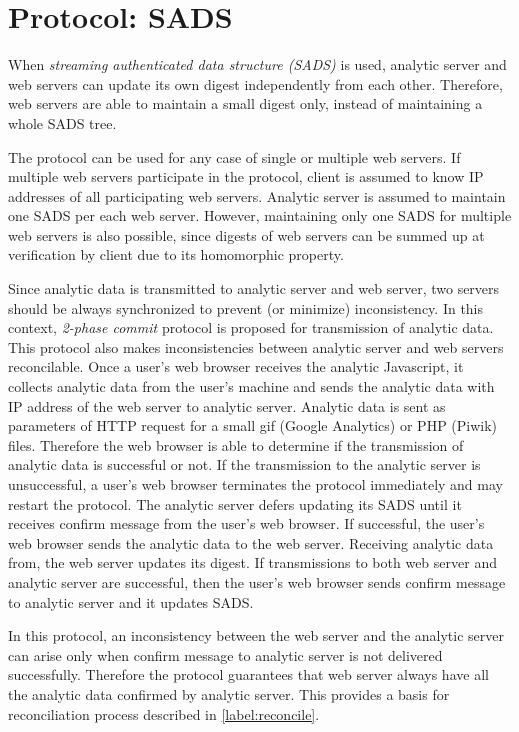\section{Protocol: SADS}

When \emph{streaming authenticated data structure (SADS)} is used, analytic server and web servers can update its own digest independently from each other.  
Therefore, web servers are able to maintain a small digest only, instead of maintaining a whole SADS tree.

The protocol can be used for any case of single or multiple web servers.
If multiple web servers participate in the protocol, client is assumed to know IP addresses of all participating web servers. 
Analytic server is assumed to maintain one SADS per each web server. 
However, maintaining only one SADS for multiple web servers is also possible, since digests of web servers can be summed up at verification by client due to its homomorphic property.

Since analytic data is transmitted to analytic server and web server, two servers should be always synchronized to prevent (or minimize) inconsistency. 
In this context, \emph{2-phase commit} protocol is proposed for transmission of analytic data. 
This protocol also makes inconsistencies between analytic server and web servers reconcilable. 
Once a user's web browser receives the analytic Javascript, it collects analytic data from the user's machine and sends the analytic data with IP address of the web server to analytic server. 
Analytic data is sent as parameters of HTTP request for a small gif (Google Analytics) or PHP (Piwik) files. 
Therefore the web browser is able to determine if the transmission of analytic data is successful or not. 
If the transmission to the analytic server is unsuccessful, a user's web browser terminates the protocol immediately and may restart the protocol. 
The analytic server defers updating its SADS until it receives confirm message from the user's web browser. 
If successful, the user's web browser sends the analytic data to the web server. 
Receiving analytic data from, the web server updates its digest. 
If transmissions to both web server and analytic server are successful, then the user's web browser sends confirm message to analytic server and it updates SADS.

In this protocol, an inconsistency between the web server and the analytic server can arise only when confirm message to analytic server is not delivered successfully. 
Therefore the protocol guarantees that web server always have all the analytic data confirmed by analytic server. 
This provides a basis for reconciliation process described in \ref{label:reconcile}.

